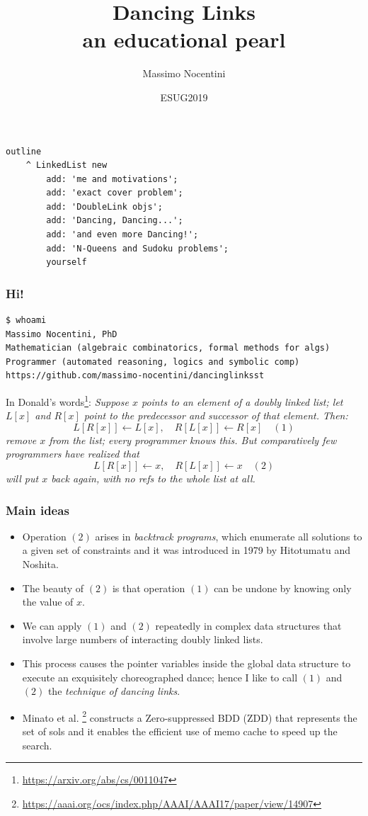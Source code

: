 \documentclass{beamer}
\title{Dancing Links\\\small{an educational pearl}}
\author{Massimo Nocentini}
\institute{University of Florence, Italy}
\date{ESUG2019 }
\begin{document}
\frame{\titlepage}

\begin{frame}[fragile]
\frametitle{}
\begin{verbatim}
outline
    ^ LinkedList new
        add: 'me and motivations';
        add: 'exact cover problem';
        add: 'DoubleLink objs';
        add: 'Dancing, Dancing...';
        add: 'and even more Dancing!';
        add: 'N-Queens and Sudoku problems';
        yourself
\end{verbatim}
\end{frame}

\begin{frame}[fragile]
\frametitle{Hi!}
\begin{Verbatim}[fontsize=\small]
$ whoami
Massimo Nocentini, PhD
Mathematician (algebraic combinatorics, formal methods for algs)
Programmer (automated reasoning, logics and symbolic comp)
https://github.com/massimo-nocentini/dancinglinksst
\end{Verbatim}
\vfill
In Donald's words\footnote{\url{https://arxiv.org/abs/cs/0011047}}:
\emph{
Suppose $x$ points to an element of a doubly linked list;
let $L[x]$ and $R[x]$ point to the predecessor and successor
of that element. Then:
\begin{displaymath}
  L[R[x]] \leftarrow L[x],\quad R[L[x]] \leftarrow R[x] \quad(1)
\end{displaymath}
remove $x$ from the list; every programmer knows this.
But comparatively few programmers have realized that
\begin{displaymath}
  L[R[x]] \leftarrow x,\quad R[L[x]] \leftarrow x \quad(2)
\end{displaymath}
will put $x$ back again, with no refs to the whole list at all.
}

\end{frame}

\begin{frame}[fragile]
\frametitle{Main ideas}

\begin{itemize}
  \item Operation $(2)$ arises in \textit{backtrack programs}, which enumerate all 
  solutions to a given set of constraints and it was introduced in 1979 by Hitotumatu and Noshita.
  \item The beauty of $(2)$ is that operation $(1)$ can be undone by knowing only the value of $x$.
  \item We can apply $(1)$ and $(2)$ repeatedly in complex data structures that involve large 
  numbers of interacting doubly linked lists.
  \item This process causes the pointer variables inside the global data structure to execute an 
  exquisitely choreographed dance; hence I like to call $(1)$ and $(2)$ the \textit{technique of dancing links}.
  \item Minato et al. \footnote{\url{https://aaai.org/ocs/index.php/AAAI/AAAI17/paper/view/14907}} 
  constructs a Zero-suppressed BDD (ZDD) that represents the set of sols and it enables the efficient 
  use of memo cache to speed up the search.
\end{itemize}
\end{frame}
\end{document}
